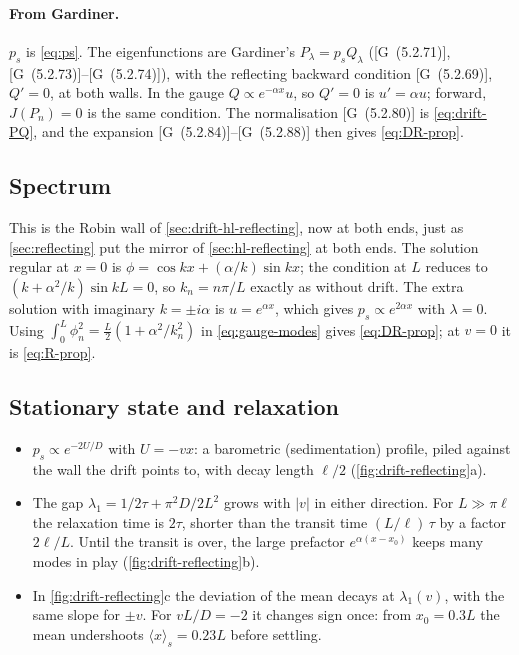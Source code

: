 \documentclass[11pt]{article}
\numberwithin{equation}{section}
\newcommand{\avg}[1]{\langle #1\rangle}
\newcommand{\G}[1]{[G~(#1)]}
\begin{document}
\paragraph{From Gardiner.} $p_s$ is \cref{eq:ps}. The eigenfunctions are Gardiner's $P_\lambda=p_sQ_\lambda$
(\G{5.2.71}, \G{5.2.73}--\G{5.2.74}), with the reflecting backward condition \G{5.2.69}, $Q'=0$, at both walls. In the gauge
$Q\propto e^{-\alpha x}u$, so $Q'=0$ is $u'=\alpha u$; forward, $J(P_n)=0$ is the same condition. The normalisation
\G{5.2.80} is \cref{eq:drift-PQ}, and the expansion \G{5.2.84}--\G{5.2.88} then gives \cref{eq:DR-prop}.

\subsection{Spectrum}

This is the Robin wall of \cref{sec:drift-hl-reflecting}, now at both ends, just as \cref{sec:reflecting} put
the mirror of \cref{sec:hl-reflecting} at both ends. The solution regular at $x=0$ is
$\phi=\cos kx+(\alpha/k)\sin kx$; the condition at $L$ reduces to $(k+\alpha^2/k)\sin kL=0$, so
$k_n=n\pi/L$ exactly as without drift. The extra solution with imaginary $k=\pm i\alpha$ is $u=e^{\alpha x}$,
which gives $p_s\propto e^{2\alpha x}$ with $\lambda=0$. Using $\int_0^L\phi_n^2=\tfrac L2(1+\alpha^2/k_n^2)$ in
\cref{eq:gauge-modes} gives \cref{eq:DR-prop}; at $v=0$ it is \cref{eq:R-prop}.

\subsection{Stationary state and relaxation}

\begin{itemize}
  \item $p_s\propto e^{-2U/D}$ with $U=-vx$: a barometric (sedimentation) profile, piled against the wall the
        drift points to, with decay length $\ell/2$ (\cref{fig:drift-reflecting}a).
  \item The gap $\lambda_1=1/2\tau+\pi^2D/2L^2$ grows with $|v|$ in either direction. For $L\gg\pi\ell$
        the relaxation time is $2\tau$, shorter than the transit time $(L/\ell)\,\tau$ by a factor $2\ell/L$.
        Until the transit is over, the large prefactor $e^{\alpha(x-x_0)}$ keeps many modes in play
        (\cref{fig:drift-reflecting}b).
  \item In \cref{fig:drift-reflecting}c the deviation of the mean decays at $\lambda_1(v)$, with the same
        slope for $\pm v$. For $vL/D=-2$ it changes sign once: from $x_0=0.3L$ the mean undershoots
        $\avg x_s=0.23L$ before settling.
\end{itemize}
\end{document}
